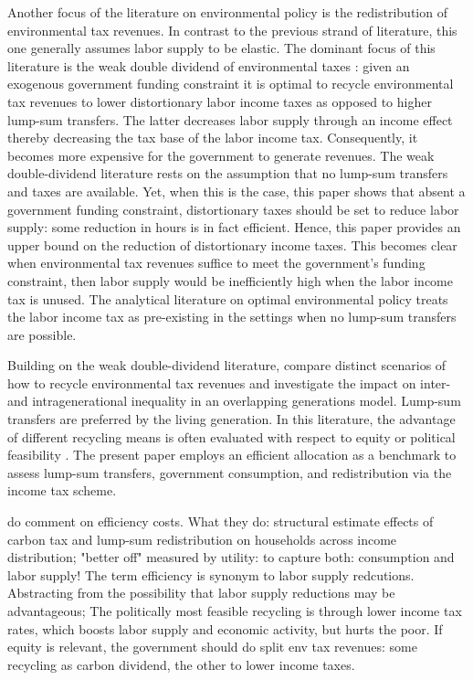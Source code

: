 Another focus of the literature on environmental policy is the redistribution of environmental tax revenues. In contrast to the previous strand of literature, this one generally assumes labor supply to be elastic. 
The dominant focus of this literature is the weak double dividend of environmental taxes \citep{LansBovenberg1994EnvironmentalTaxation, LansBovenberg1996OptimalAnalyses, Bovenberg2002EnvironmentalRegulation,  Barrage2019OptimalPolicy}: given an exogenous government funding constraint it is optimal to recycle environmental tax revenues to lower distortionary labor income taxes as opposed to higher lump-sum transfers. The latter decreases labor supply through an income effect thereby decreasing the tax base of the labor income tax. Consequently, it becomes more expensive for the government to generate revenues.
The weak double-dividend literature rests on the assumption that no lump-sum transfers and taxes are available. Yet, when this is the case, this paper shows that absent a government funding constraint, distortionary taxes should be set to reduce labor supply: some reduction in hours is in fact efficient. Hence, this paper provides an upper bound on the reduction of distortionary income taxes. This becomes clear when environmental tax revenues suffice to meet the government's funding constraint, then labor supply would be inefficiently high when the labor income tax is unused. 
The analytical literature on optimal environmental policy treats the labor income tax as pre-existing \citep{LansBovenberg1994EnvironmentalTaxation, LansBovenberg1996OptimalAnalyses} in the settings when no lump-sum transfers are possible.
 

Building on the weak double-dividend literature, \cite{Fried2018TheGenerations} compare distinct scenarios of how to recycle environmental tax revenues and investigate the impact on inter- and intragenerational inequality in an overlapping generations model. Lump-sum transfers are preferred by the  living generation. 
In this literature, the advantage of different recycling means is often evaluated with respect to equity or political feasibility \cite{Carattini2018, VANDERPLOEG2022103966}. The present paper employs an efficient allocation as a benchmark to assess lump-sum transfers, government consumption, and redistribution via the income tax scheme. 

\cite{VANDERPLOEG2022103966} do comment on efficiency costs. 
What they do: 
structural estimate effects of carbon tax and lump-sum redistribution on households across income distribution; "better off" measured by utility: to capture both: consumption and labor supply!
The term efficiency is synonym to labor supply redcutions. Abstracting from the possibility that labor supply reductions may be advantageous; The politically most feasible recycling is through lower income tax rates, which boosts labor supply and economic activity, but hurts the poor. If equity is relevant, the government should do split env tax revenues: some recycling as carbon dividend, the other to lower income taxes.


